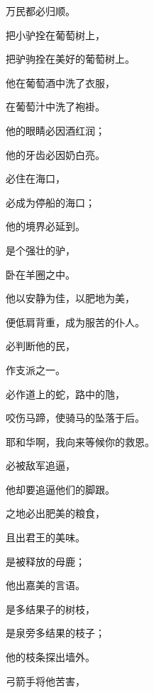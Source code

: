 {\par }{\Q 万民都必归顺。
\par }{\Q {}把小驴拴在葡萄树上，
\par }{\Q 把驴驹拴在美好的葡萄树上。
\par }{\Q 他在葡萄酒中洗了衣服，
\par }{\Q 在葡萄汁中洗了袍褂。
\par }{\Q {}他的眼睛必因酒红润；
\par }{\Q 他的牙齿必因奶白亮。
\par }{\BB \par }{\Q {}必住在海口，
\par }{\Q 必成为停船的海口；
\par }{\Q 他的境界必延到{}。
\par }{\BB \par }{\Q {}是个强壮的驴，
\par }{\Q 卧在羊圈之中。
\par }{\Q {}他以安静为佳，以肥地为美，
\par }{\Q 便低肩背重，成为服苦的仆人。
\par }{\BB \par }{\Q {}必判断他的民，
\par }{\Q 作{}支派之一。
\par }{\Q {}必作道上的蛇，路中的虺，
\par }{\Q 咬伤马蹄，使骑马的坠落于后。
\par }{\Q {}耶和华啊，我向来等候你的救恩。
\par }{\BB \par }{\Q {}必被敌军追逼，
\par }{\Q 他却要追逼他们的脚跟。
\par }{\BB \par }{\Q {}之地必出肥美的粮食，
\par }{\Q 且出君王的美味。
\par }{\BB \par }{\Q {}是被释放的母鹿；
\par }{\Q 他出嘉美的言语。
\par }{\BB \par }{\Q {}是多结果子的树枝，
\par }{\Q 是泉旁多结果的枝子；
\par }{\Q 他的枝条探出墙外。
\par }{\Q {}弓箭手将他苦害，
}
